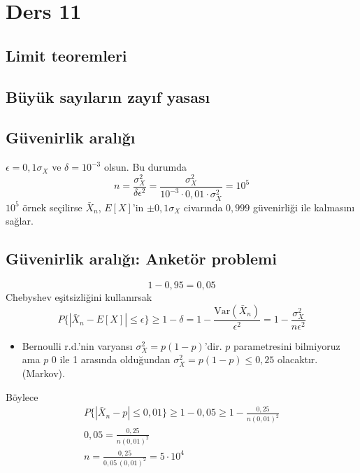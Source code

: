 \documentclass[11pt,a4paper]{article}
\begin{document}
\section{Ders 11}
\subsection{Limit teoremleri}
\subsection{Büyük sayıların zayıf yasası}

\subsection{Güvenirlik aralığı}
\begin{ornek}
  $\epsilon=0{,}1\sigma_X$ ve $\delta=10^{-3}$ olsun. Bu durumda
  \[ n=\frac{\sigma_X^2}{\delta\epsilon^2}=\frac{\sigma_X^2}{10^{-3}\cdot0{,}01\cdot\sigma_X^2}=10^{5} \]
  $10^5$ örnek seçilirse $\bar{X}_n$, $E[X]$'in $\pm0{,}1\sigma_X$ civarında $0{,}999$ güvenirliği ile kalmasını sağlar.
\end{ornek}

\subsection{Güvenirlik aralığı: Anketör problemi}
\[ 1-0{,}95=0{,}05 \]
Chebyshev eşitsizliğini kullanırsak
\[ P\{|\bar{X}_n-E[X]|\le\epsilon\}\ge1-\delta=1-\frac{\mathrm{Var}(\bar{X}_n)}{\epsilon^2}=1-\frac{\sigma_X^2}{n\epsilon^2} \]
\begin{itemize}
  \item Bernoulli r.d.'nin varyansı $\sigma_X^2=p(1-p)$'dir. $p$ parametresini bilmiyoruz ama $p$ 0 ile 1 arasında olduğundan $\sigma_X^2=p(1-p)\le0{,}25$ olacaktır. (Markov).
\end{itemize}
Böylece
\begin{gather*}
  P\{|\bar{X}_n-p|\le0{,}01\}\ge1-0{,}05\ge1-\frac{0{,}25}{n(0{,}01)^2}\\
  0{,}05=\frac{0{,}25}{n(0{,}01)^2}\\
  n=\frac{0{,}25}{0{,}05\,(0{,}01)^2}=5\cdot10^{4}
\end{gather*}
\end{document}
